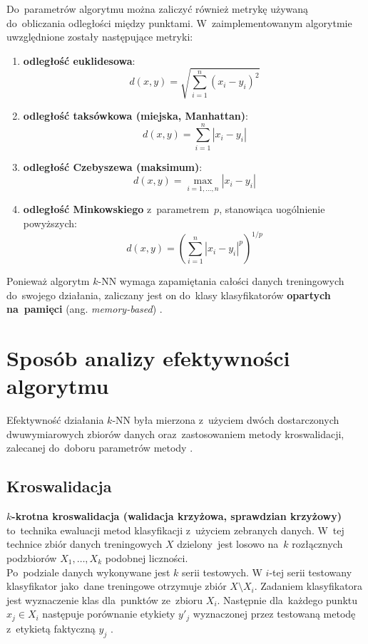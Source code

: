 \documentclass[11pt,a4paper]{article}
\begin{document}
Do~parametrów algorytmu można zaliczyć również metrykę używaną do~obliczania odległości między punktami.
W~zaimplementowanym algorytmie uwzględnione zostały następujące metryki:

\begin{enumerate}
    \item \textbf{odległość euklidesowa}:
    $$ d(x,y) = \sqrt{\sum_{i=1}^n (x_i - y_i)^2} $$
    \item \textbf{odległość taksówkowa (miejska, Manhattan)}:
    $$ d(x,y) = \sum_{i=1}^n |x_i - y_i| $$
    \item \textbf{odległość Czebyszewa (maksimum)}:
    $$ d(x,y) = \max_{i=1,\dots,n} |x_i - y_i| $$
    \item \textbf{odległość Minkowskiego} z~parametrem~$p$, stanowiąca uogólnienie powyższych:
    $$ d(x,y) = \left( \sum_{i=1}^n |x_i - y_i|^p \right)^{1/p} $$
\end{enumerate}

Ponieważ algorytm $k$-NN wymaga zapamiętania całości danych treningowych do~swojego działania, zaliczany jest on do~klasy klasyfikatorów \textbf{opartych na~pamięci} (ang. \emph{memory-based}) \cite[s.~463]{hastie2009}.

\section{Sposób analizy efektywności algorytmu}

Efektywność działania $k$-NN była mierzona z~użyciem dwóch dostarczonych dwuwymiarowych zbiorów danych oraz~zastosowaniem metody kroswalidacji, zalecanej do~doboru parametrów metody \cite[s.~470]{hastie2009}.

\subsection{Kroswalidacja}

\textbf{$k$-krotna kroswalidacja (walidacja krzyżowa, sprawdzian krzyżowy)} to~technika ewaluacji metod klasyfikacji z~użyciem zebranych danych.
W~tej technice zbiór danych treningowych $X$ dzielony~jest losowo na~$k$ rozłącznych podzbiorów $X_1,\dots,X_k$ podobnej liczności. \\

Po~podziale danych wykonywane jest $k$ serii testowych.
W $i$-tej serii testowany klasyfikator jako~dane treningowe otrzymuje zbiór $X \setminus X_i$.
Zadaniem klasyfikatora jest wyznaczenie klas dla~punktów ze~zbioru $X_i$.
Następnie dla~każdego punktu $x_j \in X_i$ następuje porównanie etykiety $y'_j$ wyznaczonej przez testowaną metodę z~etykietą faktyczną $y_j$ \cite[s.~241--243]{hastie2009}. \\
\end{document}

